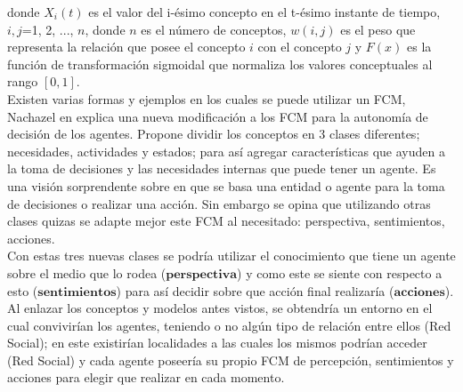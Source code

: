 donde $X_{i} (t)$ es el valor del i-ésimo concepto en el t-ésimo instante de tiempo, $i,j$=1, 2, ..., $n$, donde $n$ es el número
de conceptos, $w(i,j)$ es el peso que representa la relación que posee el concepto $i$ con el concepto $j$ y $F(x)$ es la función 
de transformación sigmoidal que normaliza los valores conceptuales al rango $[0,1]$. \autocite{Poczeta2020}\\

Existen varias formas y ejemplos en los cuales se puede utilizar un FCM, Nachazel en \autocite{Nachazel2021}
explica una nueva modificación a los FCM para la autonomía de decisión de los agentes. Propone dividir los conceptos en 3 clases
diferentes; necesidades, actividades y estados; para así agregar características que ayuden a la toma de decisiones y las necesidades 
internas que puede tener un agente. Es una visión sorprendente sobre en que se basa una entidad
o agente para la toma de decisiones o realizar una acción. Sin embargo se opina que utilizando otras clases quizas
se adapte mejor este FCM al necesitado: perspectiva, sentimientos, acciones.\\ 
Con estas tres nuevas clases se podría utilizar el conocimiento que tiene un agente sobre el medio que lo rodea ($\textbf{perspectiva}$) y  
como este se siente con respecto a esto ($\textbf{sentimientos}$) para así decidir sobre que acción final realizaría ($\textbf{acciones}$).\\

Al enlazar los conceptos y modelos antes vistos, se obtendría un entorno en el cual convivirían los agentes, teniendo o no algún
tipo de relación entre ellos (Red Social); en este existirían localidades a las cuales los mismos podrían acceder (Red Social) y 
cada agente poseería su propio FCM de percepción, sentimientos y acciones para elegir que realizar en cada momento.